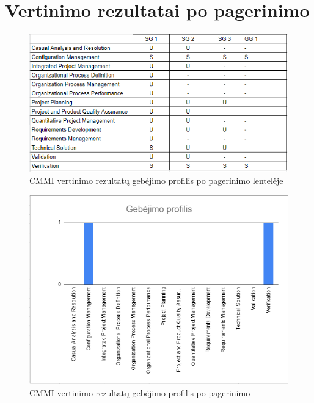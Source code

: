 \documentclass{VUMIFPSkursinis}
\begin{document}
	\section{Vertinimo rezultatai po pagerinimo}
	\begin{figure}[!htbp]
		\includegraphics[scale=0.9]{img/poPataisymo}
		\caption{CMMI vertinimo rezultatų gebėjimo profilis po pagerinimo lentelėje} %
		\label{img:ProfilisPo}
	\end{figure}
	\begin{figure}[!htbp]
		\includegraphics[scale=0.8]{img/poPataisymoProfilis}
		\caption{CMMI vertinimo rezultatų gebėjimo profilis po pagerinimo} %
		\label{img:ProfilisPo}
	\end{figure}
\end{document}
